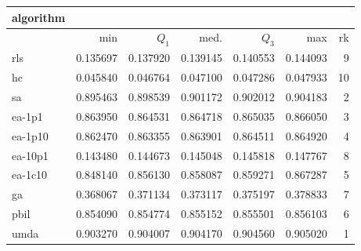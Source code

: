 \begin{tabular}{@{}l*{5}{>{{}}N{1}{3}}>{{}}N{2}{0}@{}}
\toprule
{algorithm} &  \\
\midrule
& {min} & {$Q_1$} & {med.} & {$Q_3$} & {max} & {rk}\\
\midrule
rls & 0.135697 & 0.137920 & 0.139145 & 0.140553 & 0.144093 & 9\\
hc & 0.045840 & 0.046764 & 0.047100 & 0.047286 & 0.047933 & 10\\
sa & 0.895463 & 0.898539 & 0.901172 & 0.902012 & 0.904183 & 2\\
ea-1p1 & 0.863950 & 0.864531 & 0.864718 & 0.865035 & 0.866050 & 3\\
ea-1p10 & 0.862470 & 0.863355 & 0.863901 & 0.864511 & 0.864920 & 4\\
ea-10p1 & 0.143480 & 0.144673 & 0.145048 & 0.145818 & 0.147767 & 8\\
ea-1c10 & 0.848140 & 0.856130 & 0.858087 & 0.859271 & 0.867287 & 5\\
ga & 0.368067 & 0.371134 & 0.373117 & 0.375197 & 0.378833 & 7\\
pbil & 0.854090 & 0.854774 & 0.855152 & 0.855501 & 0.856103 & 6\\
umda & {\color{blue}} 0.903270 & {\color{blue}} 0.904007 & {\color{blue}} 0.904170 & {\color{blue}} 0.904560 & {\color{blue}} 0.905020 & 1\\
\bottomrule
\end{tabular}
